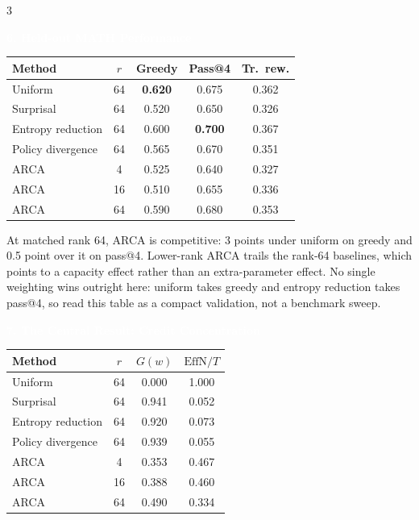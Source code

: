 \documentclass{article}
\newcommand{\headerfont}{\fontsize{29}{35}\selectfont\bfseries}
\newcommand{\bodyfont}{\fontsize{20}{27}\selectfont}
\newcommand{\tabfont}{\fontsize{19}{25}\selectfont}
\newcommand{\blockinner}[3]{%
  \begin{minipage}{#1}
    {\setlength{\fboxsep}{10pt}%
     \noindent\colorbox{primary}{\parbox{\dimexpr#1-2\fboxsep\relax}{%
        \strut\headerfont\textcolor{white}{#2}\strut}}}\par\vskip 1.5pt
    {\setlength{\fboxsep}{12pt}%
     \noindent\colorbox{boxbg}{\parbox{\dimexpr#1-2\fboxsep\relax}{%
        \bodyfont #3}}}
  \end{minipage}}
\newcommand{\block}[2]{\par\noindent\blockinner{\linewidth}{#1}{#2}\par\vspace{16pt}}
\begin{document}
\begin{multicols}{3}
\block{6.\; Held-out MATH Performance}{%
\centering\tabfont
\renewcommand{\arraystretch}{1.36}
\setlength{\tabcolsep}{7pt}
\begin{tabular}{l c c c c}
\toprule
\textbf{Method} & $r$ & \textbf{Greedy} & \textbf{Pass@4} & \textbf{Tr.\ rew.}\\
\midrule
Uniform           & 64 & \textbf{0.620} & 0.675 & 0.362\\
Surprisal         & 64 & 0.520 & 0.650 & 0.326\\
Entropy reduction & 64 & 0.600 & \textbf{0.700} & 0.367\\
Policy divergence & 64 & 0.565 & 0.670 & 0.351\\
\rowcolor{accentl} ARCA & 4  & 0.525 & 0.640 & 0.327\\
\rowcolor{accentl} ARCA & 16 & 0.510 & 0.655 & 0.336\\
\rowcolor{accentl} ARCA & 64 & 0.590 & 0.680 & 0.353\\
\bottomrule
\end{tabular}
\par\vspace{8pt}
\raggedright\fontsize{18}{24}\selectfont
At matched rank 64, ARCA is competitive: 3 points under uniform on greedy and
0.5 point over it on pass@4. Lower-rank ARCA trails the rank-64 baselines, which
points to a capacity effect rather than an extra-parameter effect. No single
weighting wins outright here: uniform takes greedy and entropy reduction takes
pass@4, so read this table as a compact validation, not a benchmark sweep.}

\block{7.\; The Central Result: Credit Concentration}{%
\centering\tabfont
\renewcommand{\arraystretch}{1.36}
\setlength{\tabcolsep}{9pt}
\begin{tabular}{l c c c}
\toprule
\textbf{Method} & $r$ & $G(w)$ & $\mathrm{EffN}/T$\\
\midrule
Uniform           & 64 & 0.000 & 1.000\\
Surprisal         & 64 & 0.941 & 0.052\\
Entropy reduction & 64 & 0.920 & 0.073\\
Policy divergence & 64 & 0.939 & 0.055\\
\rowcolor{accentl} ARCA & 4  & 0.353 & 0.467\\
\rowcolor{accentl} ARCA & 16 & 0.388 & 0.460\\
\rowcolor{accentl} ARCA & 64 & 0.490 & 0.334\\
\bottomrule
\end{tabular}

}
\end{multicols}
\end{document}
